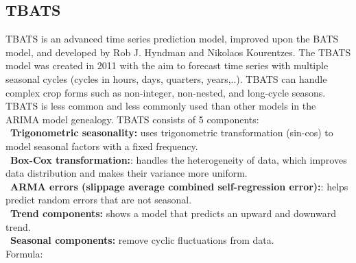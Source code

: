 \documentclass{ieeeojies}
\begin{document}
\subsection{TBATS}
TBATS is an advanced time series prediction model, improved upon the BATS model, and developed by Rob J. Hyndman and Nikolaos Kourentzes. The TBATS model was created in 2011 with the aim to forecast time series with multiple seasonal cycles (cycles in hours, days, quarters, years,..). TBATS can handle complex crop forms such as non-integer, non-nested, and long-cycle seasons.
 \\
 TBATS is less common and less commonly used than other models in the ARIMA model genealogy. TBATS consists of 5 components:\\
\indent\textbullet\ \textbf{Trigonometric seasonality: } uses trigonometric transformation (sin-cos) to model seasonal factors with a fixed frequency.
\\
\indent\textbullet\ \textbf{Box-Cox transformation:}: handles the heterogeneity of data, which improves data distribution and makes their variance more uniform. 
\\
\indent\textbullet\ \textbf{ARMA errors (slippage average combined self-regression error):}: helps predict random errors that are not seasonal.\\
\indent\textbullet\ \textbf{Trend components:} shows a model that predicts an upward and downward trend.\\
\indent\textbullet\ \textbf{Seasonal components: } remove cyclic fluctuations from data.
\\
Formula:\\
\end{document}
